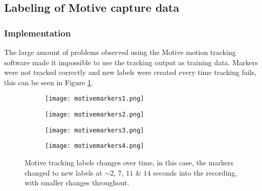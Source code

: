 \documentclass[../main.tex]{subfiles}
\begin{document}
\subsection{Labeling of Motive capture data}
\subsubsection{Implementation}
\label{sec:motivecleaning}


The large amount of problems observed using the Motive motion tracking software made it impossible to use the tracking output as training data.
Markers were not tracked correctly and new labels were created every time tracking fails, this can be seen in Figure \ref{fig:motivelabels}.

\begin{figure}[H]
    \centering
    \begin{subfigure}[b]{0.49\textwidth}
        \centering
        \texttt{[image: motivemarkers1.png]}
    \end{subfigure}
    \hfill
    \centering
    \begin{subfigure}[b]{0.49\textwidth}
        \centering
        \texttt{[image: motivemarkers2.png]}
    \end{subfigure}
    \hfill
    \begin{subfigure}[b]{0.49\textwidth}
        \centering
        \texttt{[image: motivemarkers3.png]}
    \end{subfigure}
    \hfill
    \begin{subfigure}[b]{0.49\textwidth}
        \centering
        \texttt{[image: motivemarkers4.png]}
    \end{subfigure}
    \caption{Motive tracking labels changes over time, in this case, the markers changed to new labels at $\sim 2$, $7$, $11$ \& $14$ seconds into the recording, with smaller changes throughout.}
    \label{fig:motivelabels}
\end{figure}
\end{document}
